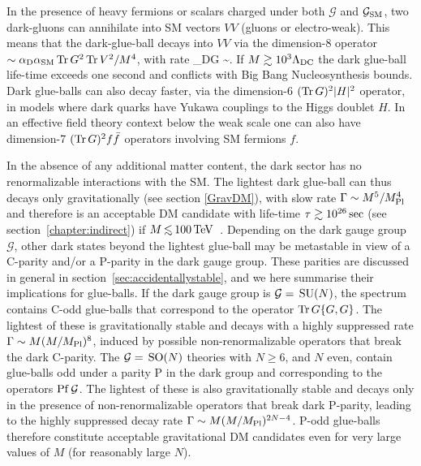 In the presence of heavy fermions or scalars charged under both $\mathcal{G}$ and $\mathcal{G}_{\rm SM}$,
two dark-gluons can annihilate into SM vectors $VV$ (gluons or electro-weak).
This means that the dark-glue-ball decays into $VV$ via the dimension-8 operator
$ \sim \alpha_{\rm D}\alpha_{\rm SM}\, \hbox{Tr}\, G^2 \, \hbox{Tr}\, V^2/M^4$, with rate
\beq \Gamma_{\rm DG} \sim {}.\eeq
If $M \gtrsim 10^3 \Lambda_{\rm DC}$ the dark glue-ball life-time exceeds one second and conflicts
with Big Bang Nucleosynthesis bounds.
Dark glue-balls can also decay faster, via the dimension-6 $(\hbox{Tr}\,  G)^2 |H|^2$ operator,
in models where dark quarks have Yukawa couplings to the Higgs doublet $H$.
In an effective field theory context below the weak scale one can also have dimension-7 $(\hbox{Tr}\, G)^2 f \bar f$ operators
involving SM fermions $f$.


In the absence of any additional matter content, the dark sector has no renormalizable interactions with the SM.
The lightest dark glue-ball can thus decays only gravitationally (see section \ref{GravDM}), with slow rate $\Gamma \sim M^5/M_{\rm Pl}^4$ and therefore is an acceptable DM candidate with life-time $\tau\gtrsim10^{26}\,{\rm sec}$ (see section~\ref{chapter:indirect}) if $M\circa{<} 100\TeV$~\cite{GravDM}.
Depending on the dark gauge group $\mathcal{G}$, other dark states beyond the lightest glue-ball may be metastable
in view of a C-parity and/or a P-parity in the dark gauge group.
These parities are discussed in general in section~\ref{sec:accidentallystable}, and we here summarise their implications for glue-balls.
If the dark gauge group is $\mathcal{G}=\,{\rm SU}(N)$, the spectrum contains C-odd glue-balls that correspond to the operator $\hbox{Tr}\, G\{G,G\}$.
The lightest of these is gravitationally stable and decays with a highly suppressed rate $\Gamma\sim M (M/M_{\rm Pl})^8$, induced by possible  non-renormalizable operators that break the dark C-parity. 
The $\mathcal{G}=\,{\rm SO}(N)$ theories with $N\ge 6$, and $N$ even, contain glue-balls 
odd under a parity P in the dark group 
and corresponding to the operators ${\rm Pf}\,{\cal G}$.
The lightest of these is also gravitationally stable and decays only in the presence of  non-renormalizable operators that break dark P-parity, leading to the highly suppressed decay rate $\Gamma\sim M (M/M_{\rm Pl})^{2N-4}$. 
P-odd glue-balls therefore constitute acceptable gravitational DM candidates even for very large values of $M$ (for reasonably large $N$). 






